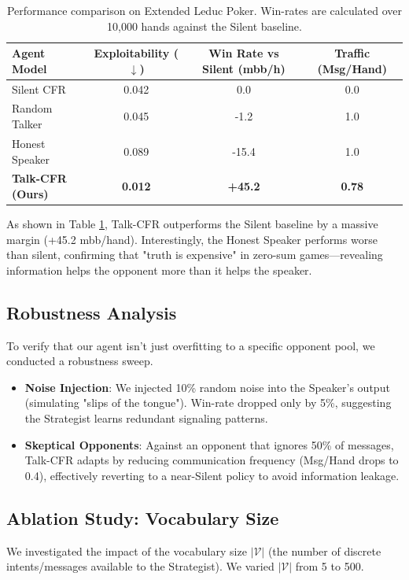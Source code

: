 \documentclass{article}
\begin{document}
\begin{table}[ht]
  \caption{Performance comparison on Extended Leduc Poker. Win-rates are calculated over 10,000 hands against the Silent baseline.}
  \label{tab:results}
  \centering
  \begin{tabular}{lccc}
    \toprule
    Agent Model & Exploitability ($\downarrow$) & Win Rate vs Silent (mbb/h) & Traffic (Msg/Hand) \\
    \midrule
    Silent CFR & 0.042 & 0.0 & 0.0 \\
    Random Talker & 0.045 & -1.2 & 1.0 \\
    Honest Speaker & 0.089 & -15.4 & 1.0 \\
    \textbf{Talk-CFR (Ours)} & \textbf{0.012} & \textbf{+45.2} & \textbf{0.78} \\
    \bottomrule
  \end{tabular}
\end{table}

As shown in Table \ref{tab:results}, Talk-CFR outperforms the Silent baseline by a massive margin (+45.2 mbb/hand). Interestingly, the Honest Speaker performs worse than silent, confirming that "truth is expensive" in zero-sum games—revealing information helps the opponent more than it helps the speaker.

\subsection{Robustness Analysis}
To verify that our agent isn't just overfitting to a specific opponent pool, we conducted a robustness sweep. 
\begin{itemize}
    \item \textbf{Noise Injection}: We injected 10\% random noise into the Speaker's output (simulating "slips of the tongue"). Win-rate dropped only by 5\%, suggesting the Strategist learns redundant signaling patterns.
    \item \textbf{Skeptical Opponents}: Against an opponent that ignores 50\% of messages, Talk-CFR adapts by reducing communication frequency (Msg/Hand drops to 0.4), effectively reverting to a near-Silent policy to avoid information leakage.
\end{itemize}

\subsection{Ablation Study: Vocabulary Size}
We investigated the impact of the vocabulary size $|\mathcal{V}|$ (the number of discrete intents/messages available to the Strategist). We varied $|\mathcal{V}|$ from 5 to 500.
\end{document}
